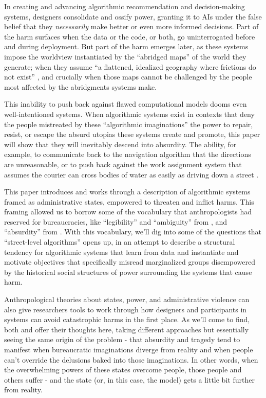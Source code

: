 \documentclass[manuscript,screen]{acmart}
\begin{document}
In creating and advancing algorithmic recommendation and decision-making systems, designers consolidate and ossify power, granting it to AIs under the false belief that they \emph{necessarily} make better or even more informed decisions.
Part of the harm surfaces when the data or the code, or both, go uninterrogated before and during deployment.
But part of the harm emerges later, as these systems impose the worldview instantiated by the ``abridged maps'' of the world they generate;
when they  assume ``a flattened, idealized geography where frictions do not exist''
\cite{GoJekAlgo}, and crucially when those maps cannot be challenged by the people most affected by the abridgments systems make.

This inability to push back against flawed computational models dooms even well-intentioned systems.
When algorithmic systems exist in contexts that deny the people mistreated by these ``algorithmic imaginations'' the power to repair, resist, or escape the absurd utopias these systems create and promote, this paper will show that they will inevitably descend into absurdity.
The ability, for example, to communicate back to the navigation algorithm that the directions are unreasonable, or to push back against the work assignment system that assumes the courier can cross bodies of water as easily as driving down a street
\cite{chan2018mediatization}.

This paper introduces and works through a description of algorithmic systems framed as administrative states, empowered to threaten and inflict harms.
This framing allowed us to borrow some of the vocabulary that anthropologists had reserved for bureaucracies, like ``legibility'' and ``ambiguity'' from \citeauthor{scott1998seeing}, and ``absurdity'' from \citeauthor{graeber2015utopia}
\cite{graeber2015utopia,scott1998seeing}.
With this vocabulary, we'll dig into some of the questions that ``street-level algorithms'' opens up, in an attempt to describe a structural tendency for algorithmic systems that learn from data and instantiate and motivate objectives that specifically misread marginalized groups disempowered by the historical social structures of power surrounding the systems that cause harm.

Anthropological theories about states, power, and administrative violence can also give researchers tools to work through how designers and participants in systems can avoid catastrophic harms in the first place.
As we'll come to find, both \citeauthor{scott1998seeing} and \citeauthor{graeber2015utopia} offer their thoughts here, taking different approaches but essentially seeing the same origin of the problem - that absurdity and tragedy tend to manifest when bureaucratic imaginations diverge from reality and when people can't override the delusions baked into those imaginations.
In other words, when the overwhelming powers of these states overcome people, those people and others suffer - and the state (or, in this case, the model) gets a little bit further from reality.
\end{document}
